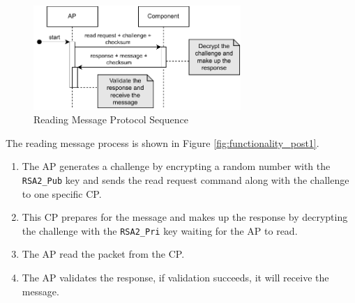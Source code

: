 \documentclass[11pt,oneside,onecolumn,letterpaper]{article}
\begin{document}
	\begin{figure}[h]
		\centering
		\includegraphics[width=0.7\textwidth]{pics/post2.pdf}
		\caption{Reading Message Protocol Sequence}
		\label{fig:functionality_post2}
	\end{figure}
	
	The reading message process is shown in Figure \ref{fig:functionality_post1}.
	\begin{enumerate}
		\item The AP generates a challenge by encrypting a random number with the \texttt{RSA2\_Pub} key and sends the read request command along with the challenge to one specific CP.
		\item This CP prepares for the message and makes up the response by decrypting the challenge with the \texttt{RSA2\_Pri} key
		waiting for the AP to read.
		\item The AP read the packet from the CP.
		\item The AP validates the response,
		if validation succeeds,
		it will receive the message.
	\end{enumerate}
	
\end{document}
